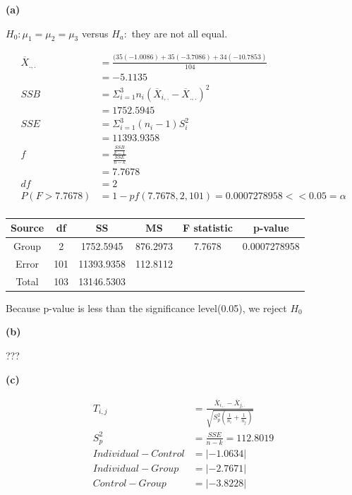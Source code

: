 \documentclass[11pt]{article}
\renewcommand\part[1]{\vspace{.10in}\textbf{(#1)}\par}
\begin{document}
	\part{a}
		$H_{0}: \mu_{1} = \mu_{2} = \mu_{3}$ versus $H_{a}:$ they are not all equal.\par
		\begin{align*}
			\overline{X}_{.,.} &= \frac{(35(-1.0086) + 35(-3.7086) + 34(-10.7853)}{104}\\
			&= -5.1135\\
			SSB &= \Sigma^{3}_{i=1} n_{i}(\overline{X}_{i,.}-\overline{X}_{.,.})^{2}\\
			&= 1752.5945\\
			SSE &= \Sigma^{3}_{i=1}(n_{i}-1)S^{2}_{i}\\
			&= 11393.9358\\
			f &= \frac{\frac{SSB}{k-1}}{\frac{SSE}{n-k}}\\
			&= 7.7678\\
			df &= 2\\
			P(F>7.7678) &= 1-pf(7.7678, 2, 101) = 0.0007278958 << 0.05 = \alpha\\
		\end{align*}\par
		\begin{tabular}{|c|c|c|c|c|c|}
			\hline
			Source & df & SS & MS & F statistic & p-value\\
			\hline
			Group & 2 & 1752.5945 & 876.2973 & 7.7678 & 0.0007278958\\
			\hline
			Error & 101 & 11393.9358 & 112.8112 & &\\
			\hline
			Total & 103 & 13146.5303 &&&\\
			\hline
		\end{tabular}\par
    Because p-value is less than the significance level(0.05), 
    we reject $H_{0}$\par
    
  \part{b}
  ???
	
	\part{c}
		\begin{align*}
			T_{i,j} &= \frac{ \overline{X}_{i,.} - \overline{X}_{j,.}}{ \sqrt{S^{2}_{p}(\frac{1}{n_{i}} + \frac{1}{n_{j}})} }\\
			S^{2}_{p} &= \frac{SSE}{n-k}=112.8019\\
			Individual-Control &= |-1.0634|\\
			Individual-Group &= |-2.7671|\\
			Control-Group &= |-3.8228|\\
		\end{align*}\par
		
\end{document}
